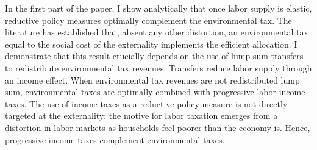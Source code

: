 
In the first part of the paper, I show analytically that once 
labor supply is elastic, reductive policy measures optimally complement the environmental tax. 
The literature has established that, absent any other distortion, an environmental tax equal to the social cost of the externality implements the efficient allocation. 
I demonstrate that this result crucially depends on the use of lump-sum transfers to redistribute environmental tax revenues. Transfers reduce labor supply through an income effect. %
When environmental tax revenues are not redistributed lump sum, environmental taxes are optimally combined with progressive labor income taxes. The use of income taxes as a reductive policy measure is not directly targeted at the externality: the motive for labor taxation emerges from a distortion in labor markets as households feel poorer than the economy is.%
Hence, progressive income taxes complement environmental taxes. %

